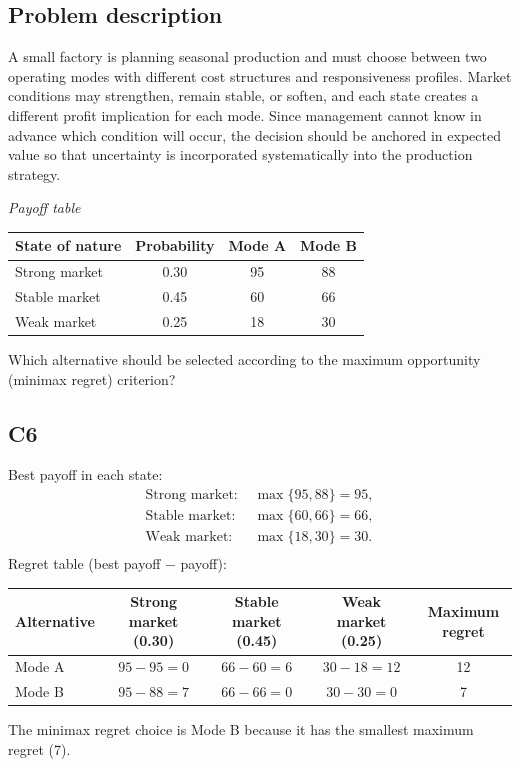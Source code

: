 \begin{ExamProblems}
		\subsection*{Problem description}
		A small factory is planning seasonal production and must choose between two operating modes with different cost structures and responsiveness profiles. Market conditions may strengthen, remain stable, or soften, and each state creates a different profit implication for each mode. Since management cannot know in advance which condition will occur, the decision should be anchored in expected value so that uncertainty is incorporated systematically into the production strategy.

		\begin{center}
			\textit{Payoff table} \par
			\begin{tabular}{l c c c}
				\toprule
				State of nature & Probability & Mode A & Mode B \\
				\midrule
				Strong market & 0.30 & 95 & 88 \\
				Stable market & 0.45 & 60 & 66 \\
				Weak market & 0.25 & 18 & 30 \\
				\bottomrule
			\end{tabular}
		\end{center}

		Which alternative should be selected according to the maximum opportunity (minimax regret) criterion?

		\subsection*{C6}
		Best payoff in each state:
		\[
		\begin{aligned}
			\text{Strong market: } &\max\{95, 88\} = 95, \\
			\text{Stable market: } &\max\{60, 66\} = 66, \\
			\text{Weak market: } &\max\{18, 30\} = 30. \\
		\end{aligned}
		\]
		Regret table (best payoff $-$ payoff):
		\begin{center}
			\begin{tabular}{l c c c c}
				\toprule
				Alternative & Strong market (0.30) & Stable market (0.45) & Weak market (0.25) & Maximum regret \\
				\midrule
				Mode A & $95-95=0$ & $66-60=6$ & $30-18=12$ & 12 \\
				Mode B & $95-88=7$ & $66-66=0$ & $30-30=0$ & 7 \\
				\bottomrule
			\end{tabular}
		\end{center}
		The minimax regret choice is Mode B because it has the smallest maximum regret (7).
		\item

\end{ExamProblems}
